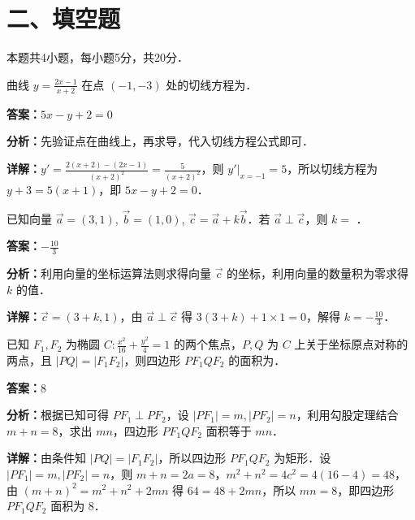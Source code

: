 \section*{二、填空题}
本题共4小题，每小题5分，共20分．

\begin{question}[points=5]
曲线 $y = \frac{2x-1}{x+2}$ 在点 $(-1, -3)$ 处的切线方程为．
\fillin[{$5x - y + 2 = 0$}]
\begin{solution}
\textbf{答案：}$5x - y + 2 = 0$

\textbf{分析：}先验证点在曲线上，再求导，代入切线方程公式即可．

\textbf{详解：}$y' = \frac{2(x+2)- (2x-1)}{(x+2)^2} = \frac{5}{(x+2)^2}$，则 $y'|_{x=-1} = 5$，所以切线方程为 $y+3=5(x+1)$，即 $5x - y + 2 = 0$．
\end{solution}
\end{question}

\begin{question}[points=5]
已知向量 $\vec{a} = (3,1)$, $\vec{b} = (1,0)$, $\vec{c} = \vec{a} + k\vec{b}$．若 $\vec{a} \perp \vec{c}$，则 $k = $ ．
\fillin[{$-\frac{10}{3}$}]
\begin{solution}
\textbf{答案：}$-\frac{10}{3}$

\textbf{分析：}利用向量的坐标运算法则求得向量 $\vec{c}$ 的坐标，利用向量的数量积为零求得 $k$ 的值．

\textbf{详解：}$\vec{c} = (3+k, 1)$，由 $\vec{a} \perp \vec{c}$ 得 $3(3+k) + 1\times 1 = 0$，解得 $k = -\frac{10}{3}$．
\end{solution}
\end{question}

\begin{question}[points=5]
已知 $F_1, F_2$ 为椭圆 $C: \frac{x^2}{16} + \frac{y^2}{4} = 1$ 的两个焦点，$P, Q$ 为 $C$ 上关于坐标原点对称的两点，且 $|PQ| = |F_1F_2|$，则四边形 $PF_1QF_2$ 的面积为．
\fillin[{$8$}]
\begin{solution}
\textbf{答案：}$8$

\textbf{分析：}根据已知可得 $PF_1 \perp PF_2$，设 $|PF_1| = m, |PF_2| = n$，利用勾股定理结合 $m+n=8$，求出 $mn$，四边形 $PF_1QF_2$ 面积等于 $mn$．

\textbf{详解：}由条件知 $|PQ| = |F_1F_2|$，所以四边形 $PF_1QF_2$ 为矩形．设 $|PF_1| = m, |PF_2| = n$，则 $m+n = 2a = 8$，$m^2+n^2 = 4c^2 = 4(16-4) = 48$，由 $(m+n)^2 = m^2+n^2+2mn$ 得 $64 = 48+2mn$，所以 $mn = 8$，即四边形 $PF_1QF_2$ 面积为 $8$．
\end{solution}
\end{question}

